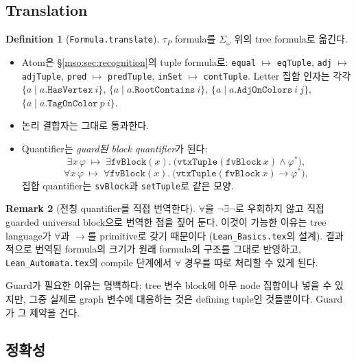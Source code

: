 \documentclass[11pt]{article}
\theoremstyle{definition}
\newtheorem{definition}{Definition}[section]
\newtheorem{remark}[definition]{Remark}
\theoremstyle{plain}
\newcommand{\lean}[1]{\texttt{#1}}
\newcommand{\leanfile}[1]{\texttt{#1}}
\begin{document}
\subsection{Translation}

\begin{definition}[\lean{Formula.translate}]
\label{mso:def:translate}
$\tau_P$ formula를 $\Sigma_\omega$ 위의 tree formula로 옮긴다.
\begin{itemize}
  \item Atom은 \S\ref{mso:sec:recognition}의 tuple formula로:
    \lean{equal} $\mapsto$ \lean{eqTuple}, \lean{adj} $\mapsto$ \lean{adjTuple},
    \lean{pred} $\mapsto$ \lean{predTuple}, \lean{inSet} $\mapsto$
    \lean{contTuple}. Letter 집합 인자는 각각
    $\{a \mid a.\lean{HasVertex}\ i\}$, $\{a \mid a.\lean{RootContains}\ i\}$,
    $\{a \mid a.\lean{AdjOnColors}\ i\ j\}$, $\{a \mid a.\lean{TagOnColor}\ p\ i\}$.
  \item 논리 결합자는 그대로 통과한다.
  \item Quantifier는 \emph{guard된 block quantifier}가 된다:
    \[
      \exists x\, \varphi \;\mapsto\;
        \exists \lean{fvBlock}(x).\ \bigl(\lean{vtxTuple}(\lean{fvBlock}\ x) \land \varphi^\ast\bigr),
    \]
    \[
      \forall x\, \varphi \;\mapsto\;
        \forall \lean{fvBlock}(x).\ \bigl(\lean{vtxTuple}(\lean{fvBlock}\ x) \to \varphi^\ast\bigr),
    \]
    집합 quantifier는 \lean{svBlock}과 \lean{setTuple}로 같은 모양.
\end{itemize}
\end{definition}

\begin{remark}[전칭 quantifier를 직접 번역한다]
$\forall$을 $\lnot\exists\lnot$로 우회하지 않고 직접 guarded universal block으로
번역한 점을 짚어 둔다. 이것이 가능한 이유는 tree language가 $\forall$과
$\to$를 primitive로 갖기 때문이다 (\leanfile{Lean\_Basics.tex}의 설계).
결과적으로 번역된 formula의 크기가 원래 formula의 구조를 그대로 반영하고,
\leanfile{Lean\_Automata.tex}의 compile 단계에서 $\forall$ 경우를 따로
처리할 수 있게 된다.

Guard가 필요한 이유는 명백하다: tree 변수 block에 아무 node 집합이나 넣을 수
있지만, 그중 실제로 graph 변수에 대응하는 것은 defining tuple인 것들뿐이다.
Guard가 그 제약을 건다.
\end{remark}

\subsection{정확성}
\end{document}
